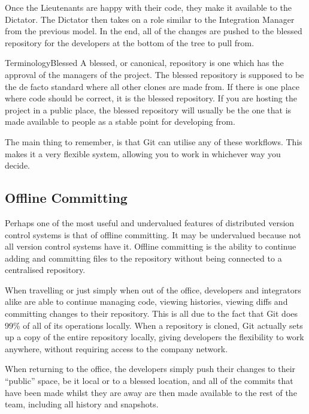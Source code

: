 Once the Lieutenants are happy with their code, they make it available to the Dictator.
The Dictator then takes on a role similar to the Integration Manager from the previous model.
In the end, all of the changes are pushed to the blessed repository for the developers at the bottom of the tree to pull from.


\begin{callout}{Terminology}{Blessed}
A blessed, or canonical, repository is one which has the approval of the managers of the project.
The blessed repository is supposed to be the de facto standard where all other clones are made from.
If there is one place where code should be correct, it is the blessed repository.
If you are hosting the project in a public place, the blessed repository will usually be the one that is made available to people as a stable point for developing from.
\end{callout}

The main thing to remember, is that Git can utilise any of these workflows.
This makes it a very flexible system, allowing you to work in whichever way you decide.

\subsection{Offline Committing}

Perhaps one of the most useful and undervalued features of distributed version control systems is that of offline committing.
It may be undervalued because not all version control systems have it.
Offline committing is the ability to continue adding and committing files to the repository without being connected to a centralised repository.

When travelling or just simply when out of the office, developers and integrators alike are able to continue managing code, viewing histories, viewing diffs and committing changes to their repository.
This is all due to the fact that Git does 99\% of all of its operations locally.
When a repository is cloned, Git actually sets up a copy of the entire repository locally, giving developers the flexibility to work anywhere, without requiring access to the company network.

When returning to the office, the developers simply push their changes to their ``public'' space, be it local or to a blessed location, and all of the commits that have been made whilst they are away are then made available to the rest of the team, including all history and snapshots.

